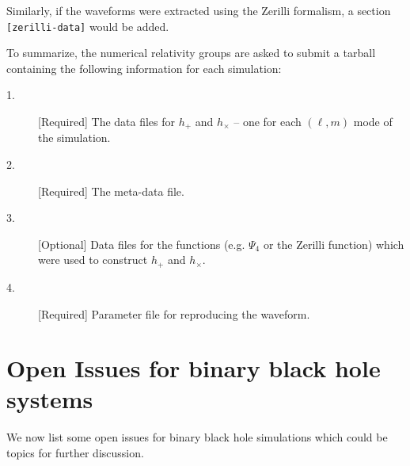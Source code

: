 \documentclass[prd,preprintnumbers,superscriptaddress,eqsecnum]{revtex4}
\numberwithin{equation}{section}
\begin{document}
Similarly, if the waveforms were extracted using the Zerilli formalism, a
section \texttt{[zerilli-data]} would be added.

To summarize, the numerical relativity groups are asked to submit a
tarball containing the following information for each simulation:
\begin{description}
\item[1.][Required] The data files for $h_+$ and $h_\times$ -- one for
  each $(\ell,m)$ mode of the simulation.
\item[2.][Required] The meta-data file.
\item[3.][Optional] Data files for the functions (e.g. $\Psi_4$ or the
  Zerilli function) which were used to construct $h_{+}$ and $h_{\times}$.
\item[4.][Required] Parameter file for reproducing the waveform.
\end{description}




\section{Open Issues for binary black hole systems}
\label{sec:openissues}

We now list some open issues for binary black hole simulations which
could be topics for further discussion.
\end{document}
